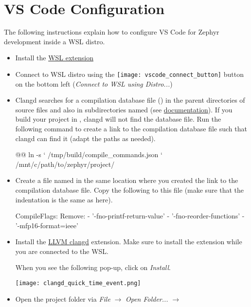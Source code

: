 \section{VS Code Configuration}

The following instructions explain how to configure VS Code for Zephyr development inside a WSL distro.

\begin{itemize}
  \item Install the \href{https://marketplace.visualstudio.com/items?itemName=ms-vscode-remote.remote-wsl}{WSL extension}
  \item Connect to WSL distro using the \texttt{[image: vscode\_connect\_button]} button on the bottom left (\emph{Connect to WSL using Distro...})
  \item Clangd searches for a compilation database file () in the parent directories of source files and also in subdirectories named  (see \href{https://clangd.llvm.org/installation#project-setup}{documentation}).
    If you build your project in , clangd will not find the database file.
    Run the following command to create a link to the compilation database file such that clangd can find it (adapt the paths as needed).

\begin{monobox}
@\cmdinwsl{}@ ln -s `
  /tmp/build/compile_commands.json `
  /mnt/c/path/to/zephyr/project/
\end{monobox}
  \item Create a file named  in the same location where you created the link to the compilation database file.
    Copy the following to this file (make sure that the indentation is the same as here).

\begin{monobox}
CompileFlags:
  Remove:
    - '-fno-printf-return-value'
    - '-fno-reorder-functions'
    - '-mfp16-format=ieee'
\end{monobox}
  \item Install the \href{https://marketplace.visualstudio.com/items?itemName=llvm-vs-code-extensions.vscode-clangd}{LLVM clangd} extension.
    Make sure to install the extension while you are connected to the WSL.

    When you see the following pop-up, click on \emph{Install}.
    \begin{center}
      \texttt{[image: clangd\_quick\_time\_event.png]}
    \end{center}
  \item Open the project folder via \emph{File} $\rightarrow$ \emph{Open Folder...} $\rightarrow$ 
\end{itemize}
